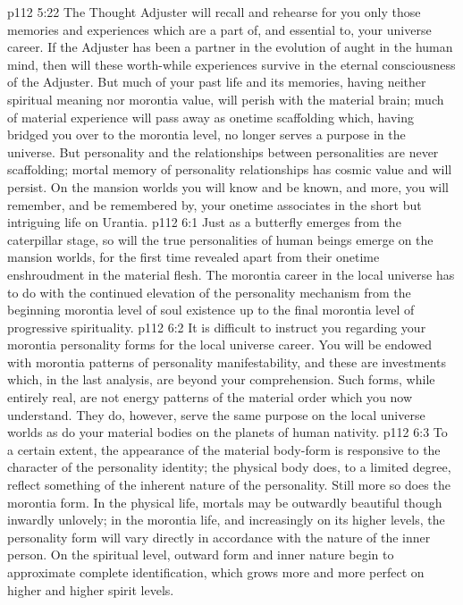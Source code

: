\vs p112 5:22 The Thought Adjuster will recall and rehearse for you only those memories and experiences which are a part of, and essential to, your universe career. If the Adjuster has been a partner in the evolution of aught in the human mind, then will these worth\hyp{}while experiences survive in the eternal consciousness of the Adjuster. But much of your past life and its memories, having neither spiritual meaning nor morontia value, will perish with the material brain; much of material experience will pass away as onetime scaffolding which, having bridged you over to the morontia level, no longer serves a purpose in the universe. But personality and the relationships between personalities are never scaffolding; mortal memory of personality relationships has cosmic value and will persist. On the mansion worlds you will know and be known, and more, you will remember, and be remembered by, your onetime associates in the short but intriguing life on Urantia.
\vs p112 6:1 Just as a butterfly emerges from the caterpillar stage, so will the true personalities of human beings emerge on the mansion worlds, for the first time revealed apart from their onetime enshroudment in the material flesh. The morontia career in the local universe has to do with the continued elevation of the personality mechanism from the beginning morontia level of soul existence up to the final morontia level of progressive spirituality.
\vs p112 6:2 It is difficult to instruct you regarding your morontia personality forms for the local universe career. You will be endowed with morontia patterns of personality manifestability, and these are investments which, in the last analysis, are beyond your comprehension. Such forms, while entirely real, are not energy patterns of the material order which you now understand. They do, however, serve the same purpose on the local universe worlds as do your material bodies on the planets of human nativity.
\vs p112 6:3 To a certain extent, the appearance of the material body\hyp{}form is responsive to the character of the personality identity; the physical body does, to a limited degree, reflect something of the inherent nature of the personality. Still more so does the morontia form. In the physical life, mortals may be outwardly beautiful though inwardly unlovely; in the morontia life, and increasingly on its higher levels, the personality form will vary directly in accordance with the nature of the inner person. On the spiritual level, outward form and inner nature begin to approximate complete identification, which grows more and more perfect on higher and higher spirit levels.
